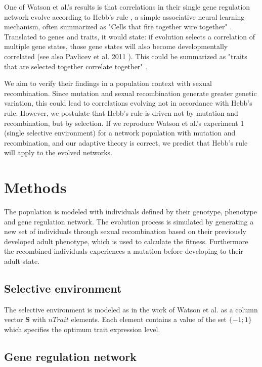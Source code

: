 \documentclass{article}
\begin{document}
One of Watson et al.'s results is that correlations in their single gene regulation network evolve according to Hebb’s rule \cite{hebb}, a simple associative neural learning mechanism, often summarized as "Cells that fire together wire together" \cite{shatz1992}.
Translated to genes and traits, it would state: if evolution selects a correlation of multiple gene states, those gene states will also become developmentally correlated (see also Pavlicev et al. 2011 \cite{pavlicev2011}).
This could be summarized as "traits that are selected together correlate together" \cite{watson2014}.

We aim to verify their findings in a population context with sexual recombination.
Since mutation and sexual recombination generate greater genetic variation, this could lead to correlations evolving not in accordance with Hebb's rule. However, we postulate that Hebb’s rule is driven not by mutation and recombination, but by selection.
If we reproduce Watson et al.’s experiment 1 (single selective environment) for a network population with mutation and recombination, and our adaptive theory is correct, we predict that Hebb’s rule will apply to the evolved networks.

\section{Methods}

The population is modeled with individuals defined by their genotype, phenotype and gene regulation network. 
The evolution process is simulated by generating a new set of individuals through sexual recombination based on their previously developed adult phenotype, which is used to calculate the fitness. Furthermore the recombined individuals experiences a mutation before developing to their adult state.


\subsection{Selective environment}

The selective environment is modeled as in the work of Watson et al. as a column vector $\bm{S}$ with $nTrait$ elements. Each element contains a value of the set $\{-1; 1\}$ which specifies the optimum trait expression level.

\subsection{Gene regulation network}
\end{document}
